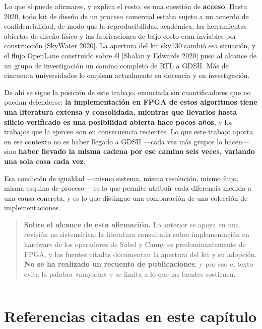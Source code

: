 Lo que sí puede afirmarse, y explica el resto, es una cuestión de
\textbf{acceso}. Hasta 2020, todo kit de diseño de un proceso comercial
estaba sujeto a un acuerdo de confidencialidad, de modo que la
reproducibilidad académica, las herramientas abiertas de diseño físico y
las fabricaciones de bajo costo eran inviables por construcción
{[}SkyWater 2020{]}. La apertura del kit sky130 cambió esa situación, y
el flujo OpenLane construido sobre él {[}Shalan y Edwards 2020{]} puso
al alcance de un grupo de investigación un camino completo de RTL a
GDSII. Más de cincuenta universidades lo emplean actualmente en docencia
y en investigación.

De ahí se sigue la posición de este trabajo, enunciada sin
cuantificadores que no puedan defenderse: \textbf{la implementación en
FPGA de estos algoritmos tiene una literatura extensa y consolidada,
mientras que llevarlos hasta silicio verificado es una posibilidad
abierta hace pocos años}, y los trabajos que la ejercen son en
consecuencia recientes. Lo que este trabajo aporta en ese contexto no es
haber llegado a GDSII ---cada vez más grupos lo hacen--- sino
\textbf{haber llevado la misma cadena por ese camino seis veces,
variando una sola cosa cada vez}.

Esa condición de igualdad ---mismo sistema, misma resolución, mismo
flujo, misma esquina de proceso--- es lo que permite atribuir cada
diferencia medida a una causa concreta, y es lo que distingue una
comparación de una colección de implementaciones.

\begin{quote}
\textbf{Sobre el alcance de esta afirmación.} Lo anterior se apoya en
una revisión no sistemática: la literatura consultada sobre
implementación en hardware de los operadores de Sobel y Canny es
predominantemente de FPGA, y las fuentes citadas documentan la apertura
del kit y su adopción. \textbf{No se ha realizado un recuento de
publicaciones}, y por eso el texto evita la palabra «mayoría» y se
limita a lo que las fuentes sostienen.
\end{quote}

\begin{center}\rule{0.5\linewidth}{0.5pt}\end{center}

\section{Referencias citadas en este
capítulo}\label{referencias-citadas-en-este-capuxedtulo}

